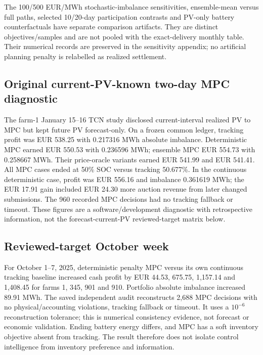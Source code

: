 The 100/500 EUR/MWh stochastic-imbalance sensitivities, ensemble-mean versus
full paths, selected 10/20-day participation contrasts and PV-only battery
counterfactuals have separate comparison artifacts. They are distinct
objectives/samples and are not pooled with the exact-delivery monthly table.
Their numerical records are preserved in the sensitivity appendix; no artificial
planning penalty is relabelled as realized settlement.

\subsection{Original current-PV-known two-day MPC diagnostic}
The farm-1 January 15--16 TCN study disclosed current-interval realized PV to
MPC but kept future PV forecast-only. On a frozen common ledger, tracking
profit was EUR 538.25 with 0.217316 MWh absolute imbalance. Deterministic MPC
earned EUR 550.53 with 0.236596 MWh; ensemble MPC EUR 554.73 with 0.258667 MWh.
Their price-oracle variants earned EUR 541.99 and EUR 541.41. All MPC cases
ended at 50\% SOC versus tracking 50.677\%. In the continuous deterministic
case, profit was EUR 556.16 and imbalance 0.361619 MWh; the EUR 17.91 gain
included EUR 24.30 more auction revenue from later changed submissions.
The 960 recorded MPC decisions had no tracking fallback or timeout. These
figures are a software/development diagnostic with retrospective information,
not the forecast-current-PV reviewed-target matrix below.

\subsection{Reviewed-target October week}
For October 1--7, 2025, deterministic penalty MPC versus its own continuous
tracking baseline increased cash profit by EUR 44.53, 675.75, 1,157.14 and
1,408.45 for farms 1, 345, 901 and 910. Portfolio absolute imbalance increased
89.91 MWh. The saved independent audit reconstructs 2,688 MPC decisions with
no physical/accounting violations, tracking fallback or timeout. It uses a
$10^{-6}$ reconstruction tolerance; this is numerical consistency evidence,
not forecast or economic validation. Ending battery energy differs, and MPC
has a soft inventory objective absent from tracking. The result therefore
does not isolate control intelligence from inventory preference and information.


